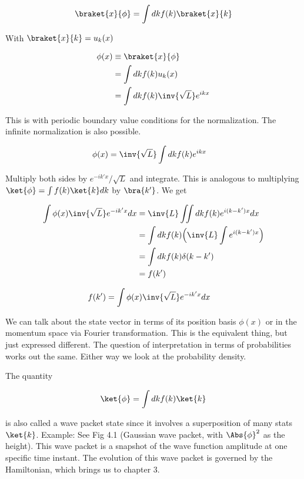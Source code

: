 \begin{align*}
\braket{x}{\phi}
&= \int dk f(k) \braket{x}{k} \\
\end{align*}

With $\braket{x}{k} = u_k(x)$

\begin{align*}
\phi(x)
&\equiv \braket{x}{\phi} \\
&= \int dk f(k) u_k(x)  \\
&= \int dk f(k) \inv{\sqrt{L}} e^{ikx}
\end{align*}

This is with periodic boundary value conditions for the normalization.  The infinite normalization is also possible.

\begin{align*}
\phi(x)
&= \inv{\sqrt{L}} \int dk f(k) e^{ikx}
\end{align*}

Multiply both sides by $e^{-ik'x}/\sqrt{L}$ and integrate.  This is analogous to multiplying $\ket{\phi} = \int f(k) \ket{k} dk$ by $\bra{k'}$.  We get

\begin{align*}
\int \phi(x) \inv{\sqrt{L}} e^{-ik'x} dx
&= \inv{L} \iint dk f(k) e^{i(k-k')x} dx \\
&= \int dk f(k) \Bigl( \inv{L} \int e^{i(k-k')x} \Bigr) \\
&= \int dk f(k) \delta(k-k') \\
&= f(k')
\end{align*}

\begin{align*}
f(k') &=
\int \phi(x) \inv{\sqrt{L}} e^{-ik'x} dx
\end{align*}

We can talk about the state vector in terms of its position basis $\phi(x)$ or in the momentum space via Fourier transformation.  This is the equivalent thing, but just expressed different.  The question of interpretation in terms of probabilities works out the same.  Either way we look at the probability density.

The quantity

\begin{align*}
\ket{\phi} = \int dk f(k) \ket{k}
\end{align*}

is also called a wave packet state since it involves a superposition of many stats $\ket{k}$.  Example: See Fig 4.1 (Gaussian wave packet, with $\Abs{\phi}^2$ as the height).  This wave packet is a snapshot of the wave function amplitude at one specific time instant.  The evolution of this wave packet is governed by the Hamiltonian, which brings us to chapter 3.

